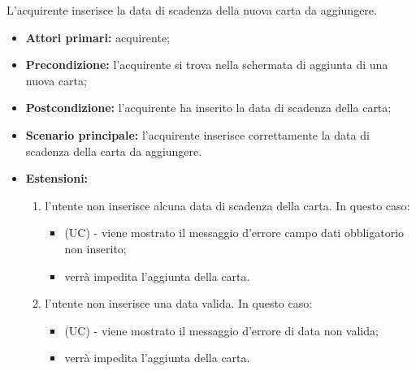 L'acquirente inserisce la data di scadenza della nuova carta da aggiungere.
\begin{itemize}
    \item \textbf{Attori primari:} acquirente;
    \item \textbf{Precondizione:} l'acquirente si trova nella schermata di aggiunta di una nuova carta;
    \item \textbf{Postcondizione:} l'acquirente ha inserito la data di scadenza della carta;
    \item \textbf{Scenario principale:} l'acquirente inserisce correttamente la data di scadenza della carta da aggiungere.
    \item \textbf{Estensioni:}
    \begin{enumerate}[label=\lett]
        \item l'utente non inserisce alcuna data di scadenza della carta. In questo caso:
        \begin{itemize}
            \item (UC) - viene mostrato il messaggio d'errore campo dati obbligatorio non inserito;
            \item verrà impedita l'aggiunta della carta.
        \end{itemize}
        \item l'utente non inserisce una data valida. In questo caso:
        \begin{itemize}
            \item (UC) - viene mostrato il messaggio d'errore di data non valida;
            \item verrà impedita l'aggiunta della carta.
        \end{itemize}
    \end{enumerate}
\end{itemize}

